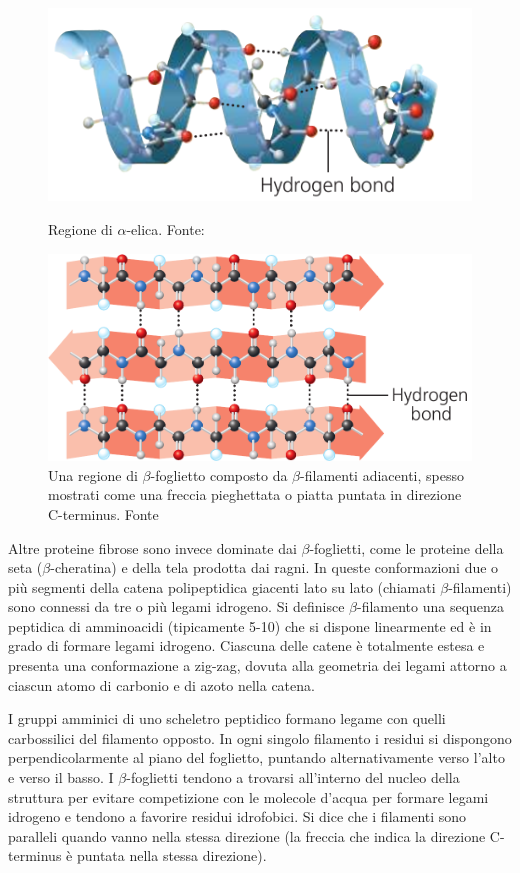{{\begin{figure}[!htb]
	\includegraphics[scale=0.34]{images/eliche.png}
	\caption{Regione di $\alpha$-elica. Fonte: \cite{campbell}}
	\label{fig:eliche}
	\endminipage\hfill
	\centering
	\includegraphics[scale=0.31]{images/foglietti.png}
	\caption{Una regione di $\beta$-foglietto composto da $\beta$-filamenti adiacenti, spesso mostrati come una freccia pieghettata o piatta puntata in direzione C-terminus. Fonte \cite{campbell}}
	\label{fig:foglietti}
	\endminipage\hfill
\end{figure}

Altre proteine fibrose sono invece dominate dai $\beta$-foglietti, come le proteine della seta ($\beta$-cheratina) e della tela prodotta dai ragni. In queste conformazioni due o più segmenti della catena polipeptidica giacenti lato su lato (chiamati $\beta$-filamenti) sono connessi da tre o più legami idrogeno. Si definisce $\beta$-filamento una sequenza peptidica di amminoacidi (tipicamente 5-10) che si dispone linearmente ed è in grado di formare legami idrogeno. Ciascuna delle catene è totalmente estesa e presenta una conformazione a zig-zag, dovuta alla geometria dei legami attorno a ciascun atomo di carbonio e di azoto nella catena.

\par  I gruppi amminici di uno scheletro peptidico formano legame con quelli carbossilici del filamento opposto. In ogni singolo filamento i residui si dispongono perpendicolarmente al piano del foglietto, puntando alternativamente verso l'alto e verso il basso. I $\beta$-foglietti tendono a trovarsi all'interno del nucleo della struttura per evitare competizione con le molecole d'acqua per formare legami idrogeno e tendono a favorire residui idrofobici. Si dice che i filamenti sono paralleli quando vanno nella stessa direzione (la freccia che indica la direzione C-terminus è puntata nella stessa direzione).


}}
